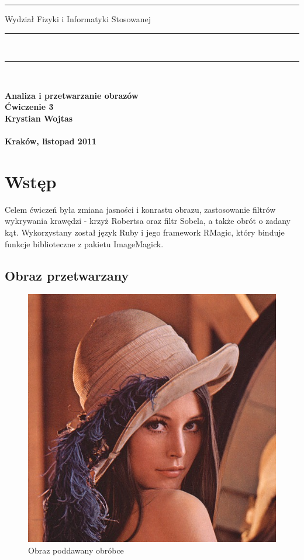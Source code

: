 \documentclass[a4paper,12pt]{article}
\begin{document}
\rule{26mm}{0pt}
{\large\textsf{Wydział Fizyki i Informatyki Stosowanej}}\\
\rule{\textwidth}{3pt}\\
\rule[2ex]
{\textwidth}{1pt}\\
\vspace{7ex}
\begin{center}
{\bf\LARGE\textsf{Analiza i przetwarzanie obrazów}}\\
\vspace{13ex}
{\bf\huge\textsf{Ćwiczenie 3}}\\
\vspace{3ex}
{\sf \small } {\bf\small\textsf{Krystian Wojtas}}\\
\vspace{14ex}
{\sf \Large } {\bf\Large\textsf{}}\\
\vspace{22ex}
\textsf{\bf\large\textsf{Kraków, listopad 2011}}
\end{center}


\newpage
\section{Wstęp}
Celem ćwiczeń była zmiana jasności i konrastu obrazu, zastosowanie filtrów wykrywania krawędzi - krzyż Robertsa oraz filtr Sobela, a także obrót o zadany kąt. Wykorzystany został język Ruby i jego framework RMagic, który binduje funkcje biblioteczne z pakietu ImageMagick.

\subsection{Obraz przetwarzany}
\begin{figure}[h!]
   \centering
   \includegraphics[width=15cm]{../../lena.jpg}
   \caption{Obraz poddawany obróbce}
\end{figure}
\end{document}
